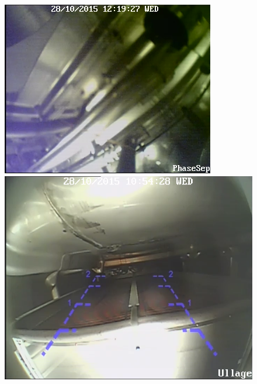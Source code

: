 \begin{figure}
 \centering
   \includegraphics[width=\linewidth]{phasesep}
 \endminipage
  \includegraphics[width=\linewidth]{ullage}
 \endminipage


\end{figure}
